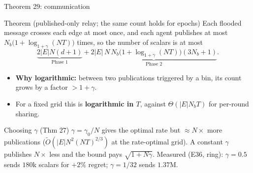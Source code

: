 \documentclass[11pt]{beamer}
\begin{document}
\begin{frame}{Theorem 29: communication}
\footnotesize
\begin{block}{Theorem (published-only relay; the same count holds for epochs)}
Each flooded message crosses each edge at most once, and each agent publishes at most $N_b\big(1+\log_{1+\gamma}(NT)\big)$ times, so the number of scalars is at most
\[
\underbrace{2|E|N(d{+}1)}_{\text{Phase 1}}+\underbrace{2|E|\,N\,N_b\big(1+\log_{1+\gamma}(NT)\big)(3N_b{+}1)}_{\text{Phase 2}} .
\]
\end{block}
\begin{itemize}
\item \textbf{Why logarithmic:} between two publications triggered by a bin, its count grows by a factor $>1+\gamma$.
\item For a fixed grid this is \textbf{logarithmic in $T$}, against $\Theta(|E|N_bT)$ for per-round sharing.
\end{itemize}
\begin{alertblock}{Choosing $\gamma$ (Thm 27)}
$\gamma=\gamma_0/N$ gives the optimal rate but $\approx N\times$ more publications ($\tilde O(|E|N^2(NT)^{2/3})$ at the rate-optimal grid). A constant $\gamma$ publishes $N\times$ less and the bound pays $\sqrt{1+N\gamma}$. Measured (E36, ring): $\gamma=0.5$ sends $180$k scalars for $+2\%$ regret; $\gamma=1/32$ sends $1.37$M.
\end{alertblock}
\end{frame}
\end{document}
